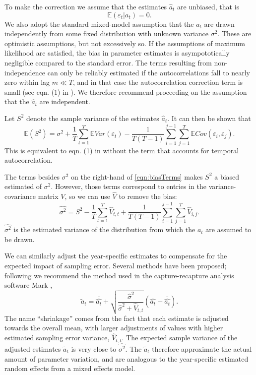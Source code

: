 \documentclass[12pt]{article}
\newcommand{\be}{\begin{equation}}
\newcommand{\ee}{\end{equation}}
\begin{document}
\begin{spacing}{1.35}
To make the correction we assume that the estimates $\hat{a}_t$ are unbiased, that is
\be
\mathbb{E}(\varepsilon_t \vert a_t) = 0.    
\ee
We also adopt the standard mixed-model assumption that the $a_t$ are drawn 
independently from some fixed distribution with unknown variance $\sigma^2$. 
These are optimistic assumptions, but not excessively so. If the assumptions of maximum likelihood are satisfied, 
the bias in parameter estimates is asympototically negligible compared to the standard error. 
The terms resulting from non-independence can only be reliably estimated if 
the autocorrelations fall to nearly zero within lag $m \ll T$, 
and in that case the autocorrelation correction term is small (see eqn. (1) in \citet{gould-nichols-1998}). 
We therefore recommend proceeding on the assumption that the $\hat{a}_t$ are independent. 

Let $S^2$ denote the sample variance of the estimates $\hat{a}_t$. It can then be shown that 
\be
\mathbb{E}(S^2) = \sigma^2  + \frac{1}{T}\sum\limits_{t=1}^T \mathbb{E} Var(\varepsilon_t) 
- \frac{1}{T(T-1)}\sum\limits_{i=1}^{j-1} \sum\limits_{j=1}^T \mathbb{E}Cov(\varepsilon_i, \varepsilon_j). 
\label{eqn:biasTerms}
\ee
This is equivalent to eqn. (1) in \citet{gould-nichols-1998} without the term that 
accounts for temporal autocorrelation. 

The terms besides $\sigma^2$ on the right-hand of \eqref{eqn:biasTerms} makes $S^2$ a biased estimated of $\sigma^2$. 
However, those terms correspond to entries in the variance-covariance matrix $V$, so we can use $\hat{V}$ to remove 
the bias: 
\be
\hat{\sigma^2}  = S^2 - \frac{1}{T}\sum\limits_{t=1}^T \hat{V}_{t,t} + 
\frac{1}{T(T-1)}\sum\limits_{i=1}^{j-1} \sum\limits_{j=1}^T \hat{V}_{i,j}. 
\label{eqn:hatSigma}
\ee
$\hat{\sigma^2}$ is the estimated variance of the distribution from which the $a_t$ are assumed
to be drawn. 

We can similarly adjust the year-specific estimates to compensate for the expected impact of sampling error. Several methods  
have been proposed; following \citet{metcalf-etal-2015} we recommend the method used in the 
capture-recapture analysis software Mark \citet{cooch-white-2020}, 
\be
\widetilde{a}_t = \bar{\hat{a_t}} + \sqrt{\frac{\hat{\sigma}^2}{\hat{\sigma}^2 + \hat{V}_{t,t}}}\left (\hat{a_t} - \bar{\hat{a_t}} \right). 
\label{eqn:ShrinkLess}
\ee
The name ``shrinkage'' comes from the fact that each estimate is adjusted towards the overall mean, with 
larger adjustments of values with higher estimated sampling error variance, $\hat{V}_{t,t}$. 
The expected sample variance of the adjusted estimates $\widetilde{a}_t$ is very close to $\hat{\sigma^2}$. 
The $\widetilde{a}_t$ therefore approximate the actual amount of parameter variation, and are analogous to the 
year-specific estimated random effects from a mixed effects model. 


\end{spacing}
\end{document}
